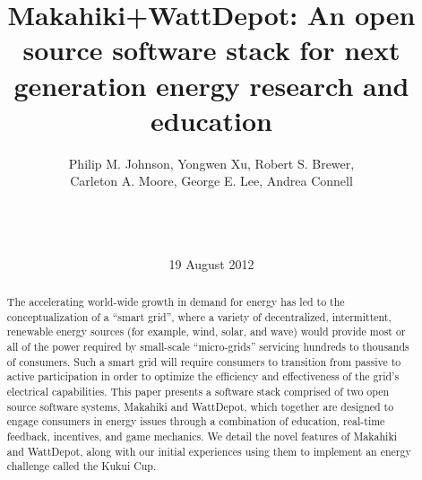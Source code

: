 \documentclass{ict4s_proc_article}
\begin{document}
\title{Makahiki+WattDepot: An open source software stack for 
next generation energy research and education}

%
%


\author{
%
 Philip M. Johnson, 
 Yongwen Xu,
 Robert S. Brewer,\\
 Carleton A. Moore,
 George E. Lee,
 Andrea Connell \\
 \\ %
       \\
\\
}

\date{19 August 2012}


\maketitle
\begin{abstract}
The accelerating world-wide growth in demand for energy has led to the conceptualization
of a ``smart grid'', where a variety of decentralized, intermittent, renewable energy
sources (for example, wind, solar, and wave) would provide most or all of the power
required by small-scale ``micro-grids'' servicing hundreds to thousands of consumers. Such
a smart grid will require consumers to transition from passive to active participation in
order to optimize the efficiency and effectiveness of the grid's electrical capabilities. 
This paper presents a software stack comprised of two open source software systems,
Makahiki and WattDepot, which together are designed to engage consumers in energy issues
through a combination of education, real-time feedback, incentives, and game mechanics. We
detail the novel features of Makahiki and WattDepot, along with our initial experiences using
them to implement an energy challenge called the Kukui Cup.

\end{abstract}
\end{document}
